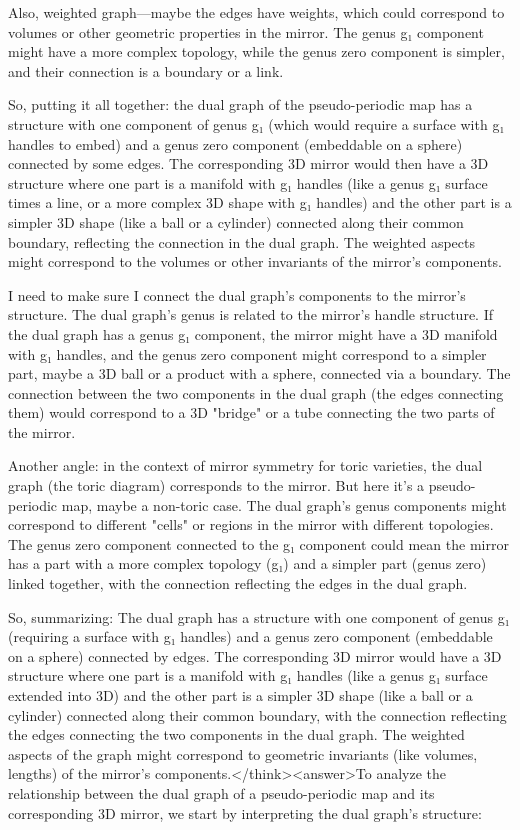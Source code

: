Also, weighted graph—maybe the edges have weights, which could correspond to volumes or other geometric properties in the mirror. The genus g₁ component might have a more complex topology, while the genus zero component is simpler, and their connection is a boundary or a link.

So, putting it all together: the dual graph of the pseudo-periodic map has a structure with one component of genus g₁ (which would require a surface with g₁ handles to embed) and a genus zero component (embeddable on a sphere) connected by some edges. The corresponding 3D mirror would then have a 3D structure where one part is a manifold with g₁ handles (like a genus g₁ surface times a line, or a more complex 3D shape with g₁ handles) and the other part is a simpler 3D shape (like a ball or a cylinder) connected along their common boundary, reflecting the connection in the dual graph. The weighted aspects might correspond to the volumes or other invariants of the mirror's components.

I need to make sure I connect the dual graph's components to the mirror's structure. The dual graph's genus is related to the mirror's handle structure. If the dual graph has a genus g₁ component, the mirror might have a 3D manifold with g₁ handles, and the genus zero component might correspond to a simpler part, maybe a 3D ball or a product with a sphere, connected via a boundary. The connection between the two components in the dual graph (the edges connecting them) would correspond to a 3D "bridge" or a tube connecting the two parts of the mirror.

Another angle: in the context of mirror symmetry for toric varieties, the dual graph (the toric diagram) corresponds to the mirror. But here it's a pseudo-periodic map, maybe a non-toric case. The dual graph's genus components might correspond to different "cells" or regions in the mirror with different topologies. The genus zero component connected to the g₁ component could mean the mirror has a part with a more complex topology (g₁) and a simpler part (genus zero) linked together, with the connection reflecting the edges in the dual graph.

So, summarizing: The dual graph has a structure with one component of genus g₁ (requiring a surface with g₁ handles) and a genus zero component (embeddable on a sphere) connected by edges. The corresponding 3D mirror would have a 3D structure where one part is a manifold with g₁ handles (like a genus g₁ surface extended into 3D) and the other part is a simpler 3D shape (like a ball or a cylinder) connected along their common boundary, with the connection reflecting the edges connecting the two components in the dual graph. The weighted aspects of the graph might correspond to geometric invariants (like volumes, lengths) of the mirror's components.</think><answer>To analyze the relationship between the dual graph of a pseudo-periodic map and its corresponding 3D mirror, we start by interpreting the dual graph’s structure:  


